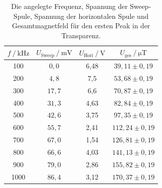 \begin{table}[H]
    \centering
    \caption{Die angelegte Frequenz, Spannung der Sweep-Spule, Spannung der horizontalen Spule und Gesamtmagnetfeld für den ersten Peak in der Transparenz.}
    \label{tab:Messung1}
    \begin{tabular}{c c c c}
      \toprule
      {$f \mathbin{/} \si{\kilo\hertz}$} & {$U_{\text{Sweep}} \mathbin{/} \si{\milli\volt}$} & {$U_{\text{Hori}} \mathbin{/} \si{\volt}$} & {$U_{\text{ges}} \mathbin{/} \si{\micro\tesla}$} \\
      \midrule
      100   &  $0,0$  & 6,48  & $39,11 \pm 0,19$   \\
      200   &  $4,8$  & 7,5   & $53,68 \pm 0,19$   \\
      300   & $17,7$  & 6,6   & $70,87 \pm 0,19$   \\
      400   & $31,3$  & 4,63  & $82,84 \pm 0,19$   \\
      500   & $42,6$  & 3,75  & $97,35 \pm 0,19$   \\
      600   & $55,7$  & 2,41  & $112,24 \pm 0,19$  \\
      700   & $67,0$  & 1,54  & $126,81 \pm 0,19$  \\
      800   & $66,6$  & 4,03  & $141,13 \pm 0,19$  \\
      900   & $79,0$  & 2,86  & $155,82 \pm 0,19$  \\
      1000  & $86,4$  & 3,12  & $170,37 \pm 0,19$  \\
      \bottomrule
    \end{tabular}
  \end{table}
  

